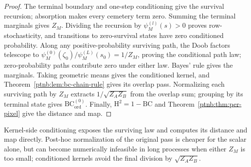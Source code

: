 \begin{proof}
The terminal boundary and one-step conditioning give the survival recursion; absorption makes every cemetery term zero. Summing the terminal marginals gives $Z_M$. Dividing the recursion by $\psi_M^{(l)}(s)>0$ proves row-stochasticity, and transitions to zero-survival states have zero conditioned probability. Along any positive-probability surviving path, the Doob factors telescope to $\psi_M^{(0)}(\zeta_0)/\psi_M^{(L)}(s_0)=1/Z_M$, proving the conditional path law; zero-probability paths contribute zero under either law. Bayes' rule gives the marginals. Taking geometric means gives the conditioned kernel, and Theorem~\ref{ptnb:lem:bc-chain-rule} gives its overlap pass. Normalizing each surviving path by $Z_M$ extracts $1/\sqrt{Z_AZ_B}$ from the overlap sum; grouping by its terminal state gives $\mathrm{BC}_{\mathrm{ord}}^{(0)}$. Finally, $\mathrm H^2=1-\mathrm{BC}$ and Theorem~\ref{ptnb:thm:per-pixel} give the distance and map.
\end{proof}

Kernel-side conditioning exposes the surviving law and computes its distance and map directly. Post-hoc normalization of the original pass is cheaper for the scalar alone, but can become numerically infeasible in long processes when either $Z_M$ is too small; conditioned kernels avoid the final division by $\sqrt{Z_AZ_B}$.
